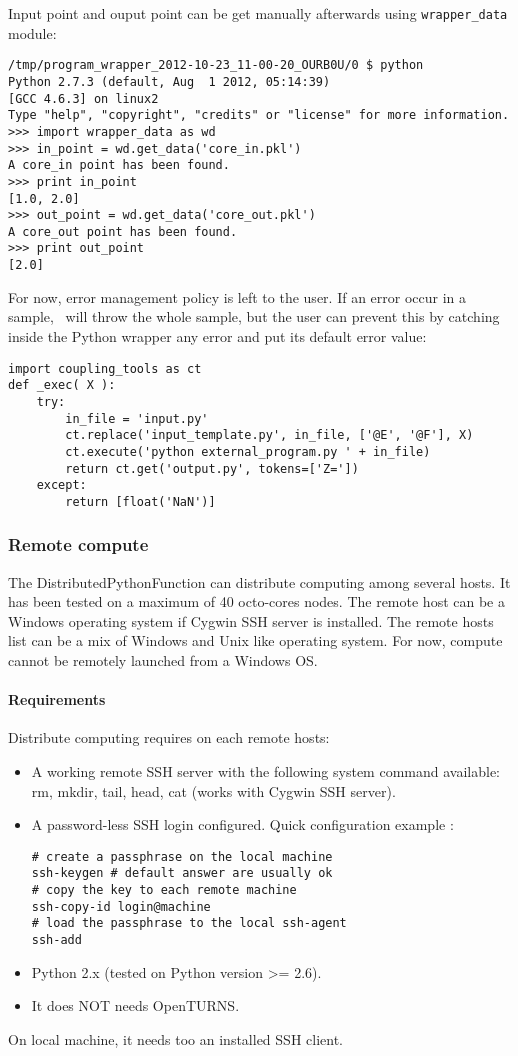 Input point and ouput point can be get manually afterwards using \verb|wrapper_data| module:
\begin{lstlisting}
/tmp/program_wrapper_2012-10-23_11-00-20_OURB0U/0 $ python 
Python 2.7.3 (default, Aug  1 2012, 05:14:39) 
[GCC 4.6.3] on linux2
Type "help", "copyright", "credits" or "license" for more information.
>>> import wrapper_data as wd
>>> in_point = wd.get_data('core_in.pkl')
A core_in point has been found.
>>> print in_point
[1.0, 2.0]
>>> out_point = wd.get_data('core_out.pkl')
A core_out point has been found.
>>> print out_point
[2.0]
\end{lstlisting}


For now, error management policy is left to the user. If an error occur in a sample, \OT\ will throw the whole sample, but the user can prevent this by catching inside the Python wrapper any error and put its default error value:
\begin{lstlisting}
import coupling_tools as ct
def _exec( X ): 
    try:
        in_file = 'input.py'
        ct.replace('input_template.py', in_file, ['@E', '@F'], X)
        ct.execute('python external_program.py ' + in_file)
        return ct.get('output.py', tokens=['Z='])
    except:
        return [float('NaN')]
\end{lstlisting}


\subsubsection{Remote compute}

The DistributedPythonFunction can distribute computing among several hosts. It has been tested on a maximum of 40 octo-cores nodes.
The remote host can be a Windows operating system if Cygwin SSH server is installed. The remote hosts list can be a mix of Windows and Unix like operating system. For now, compute cannot be remotely launched from a Windows OS.

\paragraph{Requirements} Distribute computing requires on each remote hosts:
\begin{itemize}
\item A working remote SSH server with the following system command available: rm, mkdir, tail, head, cat (works with Cygwin SSH server).
\item A password-less SSH login configured. Quick configuration example :
\begin{lstlisting}
# create a passphrase on the local machine
ssh-keygen # default answer are usually ok
# copy the key to each remote machine
ssh-copy-id login@machine
# load the passphrase to the local ssh-agent
ssh-add
\end{lstlisting}
\item Python 2.x (tested on Python version >= 2.6). 
\item It does NOT needs OpenTURNS.
\end{itemize}
On local machine, it needs too an installed SSH client.

